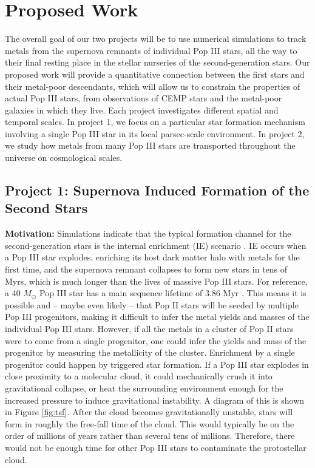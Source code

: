 \documentclass[letterpaper, 12pt]{article}
\begin{document}
\section{Proposed Work}
The overall goal of our two projects will be to use numerical simulations to track metals from the supernova remnants of individual Pop III stars, all the way to their final resting place in the stellar nurseries of the second-generation stars. Our proposed work will provide a quantitative connection between the first stars and their metal-poor descendants, which will allow us to constrain the properties of actual Pop III stars, from observations of CEMP stars and the metal-poor galaxies in which they live. Each project investigates different spatial and temporal scales. In project 1, we focus on a particular star formation mechanism involving a single Pop III star in its local parsec-scale environment. In project 2, we study how metals from many Pop III stars are transported throughout the universe on cosmological scales. 

\subsection*{Project 1: Supernova Induced Formation of the Second Stars}
\label{sec:tsf}

\textbf{Motivation:} Simulations indicate that the typical formation channel for the second-generation stars is the internal enrichment (IE) scenario \citep{Chiaki2019}. IE occurs when a Pop III star explodes, enriching its host dark matter halo with metals for the first time, and the supernova remnant collapses to form new stars in tens of Myrs, which is much longer than the lives of massive Pop III stars. For reference, a 40 $M_\odot$ Pop III star has a main sequence lifetime of 3.86 Myr \citep{Schaerer2002}. This means it is possible and -- maybe even likely -- that Pop II stars will be seeded by multiple Pop III progenitors, making it difficult to infer the metal yields and masses of the individual Pop III stars. However, if all the metals in a cluster of Pop II stars were to come from a single progenitor, one could infer the yields and mass of the progenitor by measuring the metallicity of the cluster. Enrichment by a single progenitor could happen by triggered star formation. If a Pop III star explodes in close proximity to a molecular cloud, it could mechanically crush it into gravitational collapse, or heat the surrounding environment enough for the increased pressure to induce gravitational instability. A diagram of this is shown in Figure \ref{fig:tsf}. After the cloud becomes gravitationally unstable, stars will form in roughly the free-fall time of the cloud. This would typically be on the order of millions of years rather than several tens of millions. Therefore, there would not be enough time for other Pop III stars to contaminate the protostellar cloud.
\end{document}

